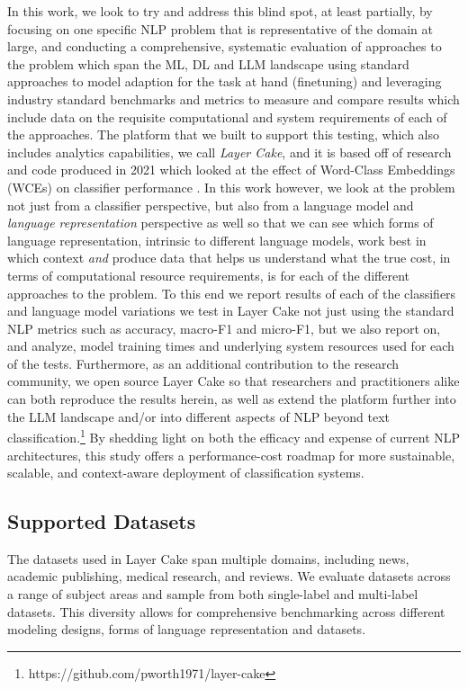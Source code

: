 \documentclass[final]{clv2025}
\begin{document}
In this work, we look to try and address this blind spot, at least partially, by focusing on one specific NLP problem that is representative of the domain at large, and conducting a comprehensive, systematic evaluation of approaches to the problem which span the ML, DL and LLM landscape using standard approaches to model adaption for the task at hand (finetuning) and leveraging industry standard benchmarks and metrics to measure and compare results which include data on the requisite computational and system requirements of each of the approaches. The platform that we built to support this testing, which also includes analytics capabilities, we call \textit{Layer Cake}, and it is based off of research and code produced in 2021 which looked at the effect of Word-Class Embeddings (WCEs) on classifier performance \cite{moreo2021}. In this work however, we look at the problem not just from a classifier perspective, but also from a language model and \textit{language representation} perspective as well so that we can see which forms of language representation, intrinsic to different language models, work best in which context \textit{and} produce data that helps us understand what the true cost, in terms of computational resource requirements, is for each of the different approaches to the problem. To this end we report results of each of the classifiers and language model variations we test in Layer Cake not just using the standard NLP metrics such as accuracy, macro-F1 and micro-F1, but we also report on, and analyze, model training times and underlying system resources used for each of the tests. Furthermore, as an additional contribution to the research community, we open source Layer Cake so that researchers and practitioners alike can both reproduce the results herein, as well as extend the platform further into the LLM landscape and/or into different aspects of NLP beyond text classification.\footnote{https://github.com/pworth1971/layer-cake} By shedding light on both the efficacy and expense of current NLP architectures, this study offers a performance-cost roadmap for more sustainable, scalable, and context-aware deployment of classification systems. 


\subsection{Supported Datasets}

The datasets used in Layer Cake span multiple domains, including news, academic publishing, medical research, and reviews. We evaluate datasets across a range of subject areas and sample from both single-label and multi-label datasets. This diversity allows for comprehensive benchmarking across different modeling designs, forms of language representation and datasets.
\end{document}
